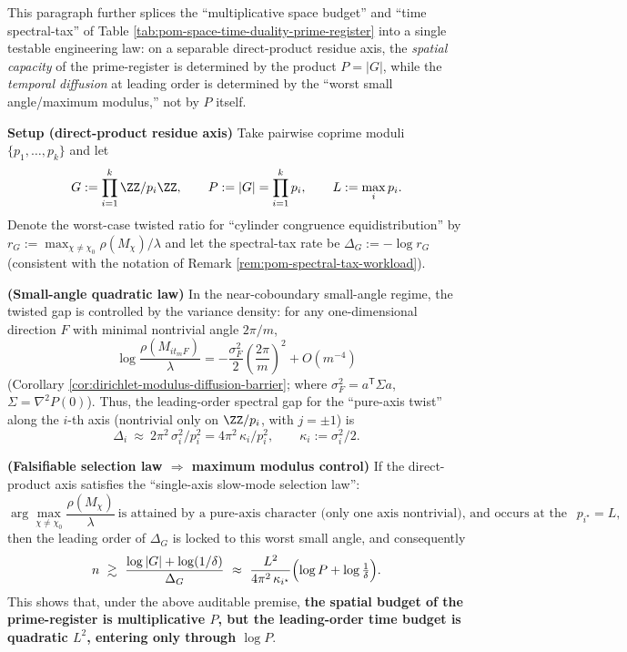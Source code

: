 \begin{remark}\label{rem:pom-max-modulus-control-law}
This paragraph further splices the ``multiplicative space budget'' and ``time spectral-tax'' of Table \ref{tab:pom-space-time-duality-prime-register} into a single testable engineering law: on a separable direct-product residue axis, the \emph{spatial capacity} of the prime-register is determined by the product \(P=|G|\), while the \emph{temporal diffusion} at leading order is determined by the ``worst small angle/maximum modulus,'' not by \(P\) itself.
\par
\medskip\noindent\textbf{Setup (direct-product residue axis)}
Take pairwise coprime moduli \(\{p_1,\dots,p_k\}\) and let
\[
G:=\prod_{i=1}^k\ZZ/p_i\ZZ,
\qquad
P:=|G|=\prod_{i=1}^k p_i,
\qquad
L:=\max_i p_i.
\]
Denote the worst-case twisted ratio for ``cylinder congruence equidistribution'' by
\(
r_G:=\max_{\chi\neq\chi_0}\rho(M_\chi)/\lambda
\)
and let the spectral-tax rate be
\(
\Delta_G:=-\log r_G
\)
(consistent with the notation of Remark \ref{rem:pom-spectral-tax-workload}).
\par
\medskip\noindent\textbf{(Small-angle quadratic law)}
In the near-coboundary small-angle regime, the twisted gap is controlled by the variance density: for any one-dimensional direction \(F\) with minimal nontrivial angle \(2\pi/m\),
\[
\log\frac{\rho(M_{it_mF})}{\lambda}
=-\frac{\sigma_F^2}{2}\left(\frac{2\pi}{m}\right)^2+O(m^{-4})
\]
(Corollary \ref{cor:dirichlet-modulus-diffusion-barrier}; where \(\sigma_F^2=a^{\mathsf T}\Sigma a\), \(\Sigma=\nabla^2P(0)\)).
Thus, the leading-order spectral gap for the ``pure-axis twist'' along the \(i\)-th axis (nontrivial only on \(\ZZ/p_i\), with \(j=\pm1\)) is
\[
\Delta_i\ \approx\ 2\pi^2\,\sigma_i^2/p_i^2
=4\pi^2\,\kappa_i/p_i^2,
\qquad \kappa_i:=\sigma_i^2/2.
\]
\par
\medskip\noindent\textbf{(Falsifiable selection law \(\Rightarrow\) maximum modulus control)}
If the direct-product axis satisfies the ``single-axis slow-mode selection law'':
\[
\arg\max_{\chi\neq\chi_0}\frac{\rho(M_\chi)}{\lambda}
\ \text{is attained by a pure-axis character (only one axis nontrivial), and occurs at the largest modulus }p_{i^\star}=L,
\]
then the leading order of \(\Delta_G\) is locked to this worst small angle, and consequently
\[
n\ \gtrsim\ \frac{\log|G|+\log(1/\delta)}{\Delta_G}
\ \approx\
\frac{L^2}{4\pi^2\,\kappa_{i^\star}}\Bigl(\log P+\log\tfrac{1}{\delta}\Bigr).
\]
This shows that, under the above auditable premise, \textbf{the spatial budget of the prime-register is multiplicative \(P\), but the leading-order time budget is quadratic \(L^2\), entering only through \(\log P\)}.

\end{remark}
